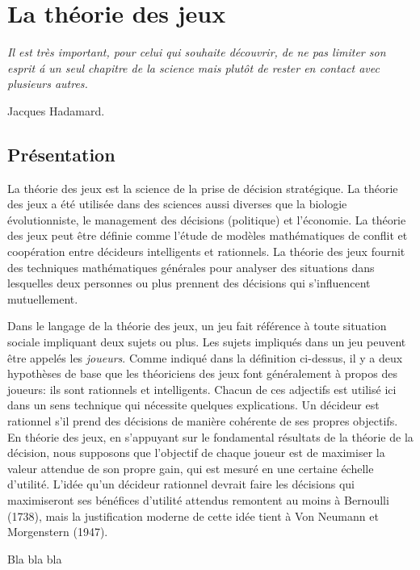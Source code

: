 
\chapter{La th\'eorie des jeux} \label{CHAP3}
\smallskip
\hfill
\begin{minipage}[b]{8cm}
{\it Il est tr\`es important, pour celui qui souhaite d\'ecouvrir, de ne pas limiter son esprit \'a un seul chapitre de la
science mais plut\^ot de rester en contact avec plusieurs autres.}
\end{minipage}
\begin{flushright} Jacques Hadamard. \end{flushright}
\vskip 2cm


\section{Pr\'esentation}

La th\'eorie des jeux est la science de la prise de d\'ecision strat\'egique. La théorie des jeux a été utilisée dans des sciences aussi diverses que la biologie évolutionniste, le management des d\'ecisions (politique) et l'économie. La th\'eorie des jeux peut \^etre d\'efinie comme l'\'etude de mod\`eles math\'ematiques de conflit et coop\'eration entre d\'ecideurs intelligents et rationnels.
La th\'eorie des jeux fournit des techniques math\'ematiques g\'en\'erales pour analyser des situations dans lesquelles deux personnes ou plus prennent des d\'ecisions qui s'influencent mutuellement.

Dans le langage de la th\'eorie des jeux, un jeu fait r\'ef\'erence \`a toute situation sociale impliquant deux sujets ou plus. Les sujets impliqu\'es dans un jeu peuvent \^etre appel\'es les \emph{joueurs}. Comme indiqu\'e dans la d\'efinition ci-dessus, il y a deux hypoth\`eses de base que les th\'eoriciens des jeux font g\'en\'eralement \`a propos des joueurs: ils sont rationnels et intelligents. 
Chacun de ces adjectifs est utilis\'e ici dans un sens technique qui n\'ecessite quelques explications. Un d\'ecideur est rationnel s'il prend des d\'ecisions de mani\`ere coh\'erente de ses propres objectifs. En th\'eorie des jeux, en s'appuyant sur le fondamental r\'esultats de la théorie de la d\'ecision, nous supposons que l'objectif de chaque joueur est de maximiser la valeur attendue de son propre gain, qui est mesur\'e en une certaine \'echelle d'utilit\'e. L'id\'ee qu'un décideur rationnel devrait faire les d\'ecisions qui maximiseront ses b\'en\'efices d'utilit\'e attendus remontent au moins \`a Bernoulli (1738), mais la justification moderne de cette id\'ee tient \`a Von Neumann et Morgenstern (1947).


Bla bla bla